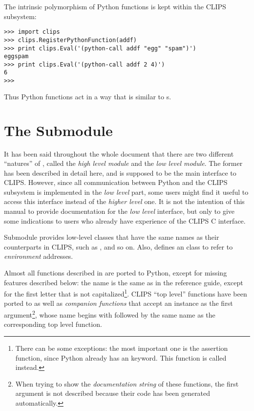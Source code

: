 The intrinsic polymorphism of Python functions is kept within the CLIPS
subsystem:

\begin{verbatim}
>>> import clips
>>> clips.RegisterPythonFunction(addf)
>>> print clips.Eval('(python-call addf "egg" "spam")')
eggspam
>>> print clips.Eval('(python-call addf 2 4)')
6
>>>
\end{verbatim}

Thus Python functions act in a way that is similar to s.



\chapter{The  Submodule\label{pyclips-llclips}}

It has been said throughout the whole document that there are two
different ``natures'' of \pyclips{}, called the \emph{high level module}
and the \emph{low level module}. The former has been described in detail
here, and is supposed to be the main interface to CLIPS. However, since
all communication between Python and the CLIPS subsystem is implemented
in the \emph{low level} part, some users might find it useful to access
this interface instead of the \emph{higher level} one. It is not the
intention of this manual to provide documentation for the \emph{low
level}  interface, but only to give some indications
to users who already have experience of the CLIPS C interface.

Submodule  provides low-level classes that have the
same names as their counterparts in CLIPS, such as ,
 and so on. Also,  defines an
 class to refer to \emph{environment} addresses.

Almost all functions described in \clipsapg{} are ported to Python,
except for missing features described below: the name is the same as in
the reference guide, except for the first letter that is not
capitalized\footnote{There can be some exceptions: the most
important one is the assertion function, since Python already has an
 keyword. This function is called 
instead.}. CLIPS ``top level'' functions have been ported to
 as well as \emph{companion functions} that accept
an  instance as the first argument\footnote{When
trying to show the \emph{documentation string} of these functions, the
first argument is not described because their code has been generated
automatically.}, whose name begins with  followed by the same
name as the corresponding top level function.


